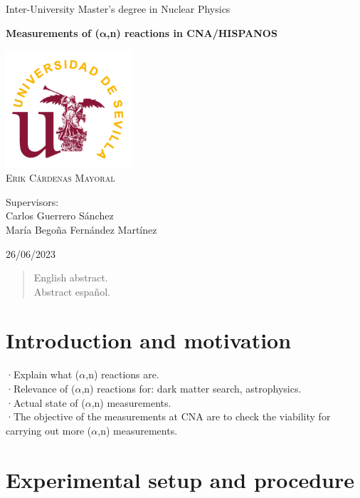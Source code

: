 \documentclass[a4paper,12pt]{report}
\newcommand{\an}{($\alpha$,n) }
\begin{document}
\begin{titlepage}
	\centering
	\Huge Inter-University Master's degree in Nuclear Physics\par
	\vspace*{3cm}
	\HUGE \textbf{Measurements of ($\bm{\alpha}$,n) reactions in CNA/HISPANOS}\par	%
	\vspace{1cm}
	\includegraphics[width=0.35\textwidth]{us.png}\\
	\vspace{1cm}
	\Large \textsc{Erik Cárdenas Mayoral}\par
	\vspace{2cm}
	Supervisors:\\
	Carlos Guerrero Sánchez\\
	María Begoña Fernández Martínez\par
	\vfill
	26/06/2023
\end{titlepage}

\begin{abstract}
English abstract.
\\
Abstract español.
\end{abstract}

\tableofcontents

\chapter{Introduction and motivation}
·Explain what \an reactions are.\\

·Relevance of \an reactions for: dark matter search, astrophysics.\\

·Actual state of \an measurements.\\

·The objective of the measurements at CNA are to check the viability for carrying out more \an measurements.\\


\chapter{Experimental setup and procedure}
\end{document}
